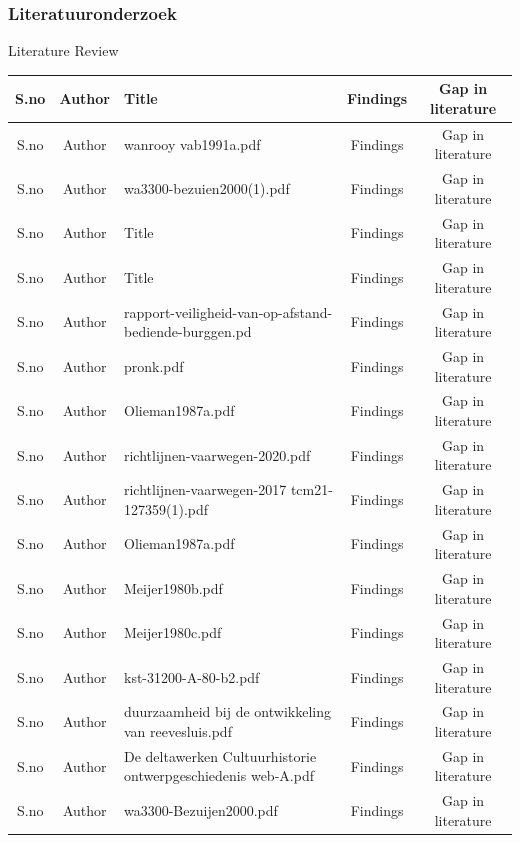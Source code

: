 \subsubsection{Literatuuronderzoek}
\begin{frame}{Literature Review}
	\begin{table}[htbp]
		\footnotesize
		
		\centering
		\begin{tabular}{|c|c|p{2in}|c|c|}\hline
			S.no&Author&Title&Findings&Gap in literature\\\hline
			S.no&Author&wanrooy \textunderscore vab1991a.pdf&Findings&Gap in literature\\\hline
			S.no&Author&wa3300-bezuien2000(1).pdf&Findings&Gap in literature\\\hline
			S.no&Author&Title&Findings&Gap in literature\\\hline
			S.no&Author&Title&Findings&Gap in literature\\\hline
			S.no&Author&rapport-veiligheid-van-op-afstand-bediende-burggen.pd&Findings&Gap in literature\\\hline
			S.no&Author&pronk.pdf&Findings&Gap in literature\\\hline
			S.no&Author&Olieman1987a.pdf&Findings&Gap in literature\\\hline
			S.no&Author&richtlijnen-vaarwegen-2020.pdf&Findings&Gap in literature\\\hline
			S.no&Author&richtlijnen-vaarwegen-2017 \textunderscore tcm21-127359(1).pdf&Findings&Gap in literature\\\hline
			S.no&Author&Olieman1987a.pdf&Findings&Gap in literature\\\hline
			S.no&Author&Meijer1980b.pdf&Findings&Gap in literature\\\hline
			S.no&Author&Meijer1980c.pdf&Findings&Gap in literature\\\hline
			S.no&Author&kst-31200-A-80-b2.pdf&Findings&Gap in literature\\\hline
			S.no&Author&duurzaamheid \textunderscore bij \textunderscore de \textunderscore ontwikkeling \textunderscore van \textunderscore reevesluis.pdf&Findings&Gap in literature\\\hline
			S.no&Author&De \textunderscore deltawerken \textunderscore Cultuurhistorie \textunderscore ontwerpgeschiedenis \textunderscore web-A.pdf&Findings&Gap in literature\\\hline
			S.no&Author&wa3300-Bezuijen2000.pdf&Findings&Gap in literature\\\hline

\end{tabular}
\end{table}
\end{frame}
